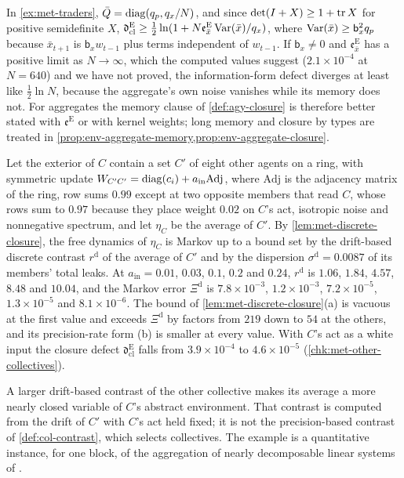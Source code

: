 \begin{remark}\label{rem:met-aggregate-defect}
In \cref{ex:met-traders}, $\bar Q=\operatorname{diag}(q_p,q_x/N)$, and since $\det(I+X)\ge1+\operatorname{tr} X$ for positive semidefinite $X$, $\mathfrak d^{\mathrm E}_{\mathrm{cl}}\ge\frac12\ln(1+N\mathfrak e^{\mathrm E}_{\bar x}\operatorname{Var}(\bar x)/q_x)$, where $\operatorname{Var}(\bar x)\ge\mathsf b_x^2q_p$ because $\bar x_{t+1}$ is $\mathsf b_xw_{t-1}$ plus terms independent of $w_{t-1}$. If $\mathsf b_x\neq0$ and $\mathfrak e^{\mathrm E}_{\bar x}$ has a positive limit as $N\to\infty$, which the computed values suggest ($2.1\times10^{-4}$ at $N=640$) and we have not proved, the information-form defect diverges at least like $\frac12\ln N$, because the aggregate's own noise vanishes while its memory does not. For aggregates the memory clause of \cref{def:agy-closure} is therefore better stated with $\mathfrak e^{\mathrm E}$ or with kernel weights; long memory and closure by types are treated in \cref{prop:env-aggregate-memory,prop:env-aggregate-closure}.
\end{remark}

\begin{example}\label{ex:met-other-collectives}
Let the exterior of $C$ contain a set $C'$ of eight other agents on a ring, with symmetric update $W_{C'C'}=\operatorname{diag}(c_i)+a_{\mathrm{in}}\mathrm{Adj}$, where $\mathrm{Adj}$ is the adjacency matrix of the ring, row sums $0.99$ except at two opposite members that read $C$, whose rows sum to $0.97$ because they place weight $0.02$ on $C$'s act, isotropic noise and nonnegative spectrum, and let $\eta_C$ be the average of $C'$. By \cref{lem:met-discrete-closure}, the free dynamics of $\eta_C$ is Markov up to a bound set by the drift-based discrete contrast $r^{\mathrm d}$ of the average of $C'$ and by the dispersion $\sigma^{\mathrm d}=0.0087$ of its members' total leaks. At $a_{\mathrm{in}}=0.01$, $0.03$, $0.1$, $0.2$ and $0.24$, $r^{\mathrm d}$ is $1.06$, $1.84$, $4.57$, $8.48$ and $10.04$, and the Markov error $\Xi^{\mathrm d}$ is $7.8\times10^{-3}$, $1.2\times10^{-3}$, $7.2\times10^{-5}$, $1.3\times10^{-5}$ and $8.1\times10^{-6}$. The bound of \cref{lem:met-discrete-closure}(a) is vacuous at the first value and exceeds $\Xi^{\mathrm d}$ by factors from $219$ down to $54$ at the others, and its precision-rate form (b) is smaller at every value. With $C$'s act as a white input the closure defect $\mathfrak d^{\mathrm E}_{\mathrm{cl}}$ falls from $3.9\times10^{-4}$ to $4.6\times10^{-5}$ (\cref{chk:met-other-collectives}).
\end{example}
A larger drift-based contrast of the other collective makes its average a more nearly closed variable of $C$'s abstract environment. That contrast is computed from the drift of $C'$ with $C$'s act held fixed; it is not the precision-based contrast of \cref{def:col-contrast}, which selects collectives. The example is a quantitative instance, for one block, of the aggregation of nearly decomposable linear systems of \citet{simon1961aggregation}.

